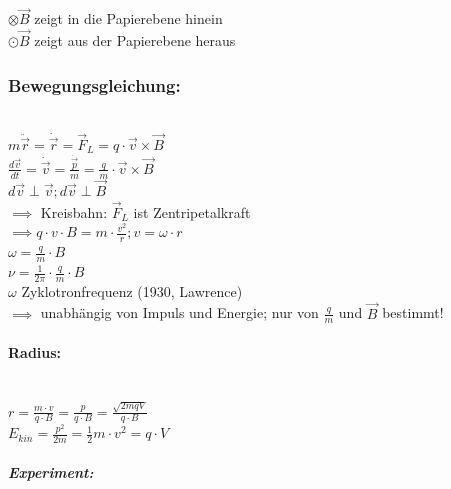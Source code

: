       $\otimes \vec{B}$ zeigt in die Papierebene hinein\\
      
      $\odot \vec{B}$ zeigt aus der Papierebene heraus\\
      
      
  \subsubsection{Bewegungsgleichung:}\leavevmode \\
  
  $m\ddot{\vec{r}} = \dot{\vec{r}}=\vec{F}_L=q\cdot\vec{v}\times\vec{B} $\\
  
  $\frac{d\vec{v}}{dt}=\dot{\vec{v}}=\frac{\dot{\vec{p}}}{m}=\frac{q}{m}\cdot\vec{v}\times\vec{B}$\\
  
  $d\vec{v}\perp \vec{v}; d\vec{v}\perp\vec{B}$\\
  
  $\implies$  Kreisbahn: $\vec{F}_L$ ist Zentripetalkraft\\
  
  $\implies q\cdot v\cdot B=m\cdot\frac{v^2}{r}; v=\omega\cdot r$\\
  
  $\boxed{\omega=\frac{q}{m}\cdot B}$\\
  
  $\boxed{\nu=\frac{1}{2\pi}\cdot\frac{q}{m}\cdot B}$\\
  
  $\omega$ Zyklotronfrequenz (1930, Lawrence)\\
  
  $\implies$ unabhängig von Impuls und Energie; nur von $\frac{q}{m}$ und $\vec{B}$ bestimmt!\\
  
  \paragraph{Radius:}\leavevmode \\
  
  $r=\frac{m\cdot v}{q\cdot B}=\frac{p}{q\cdot B}= \frac{\sqrt{2mqV}}{q\cdot B}$\\
  
  $E_{kin}=\frac{p^2}{2m}=\frac{1}{2}m\cdot v^2=q\cdot V$\\
  
  \subparagraph{Experiment:}\leavevmode \\
  

